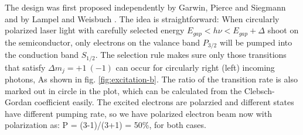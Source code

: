The design was first proposed independently by Garwin, Pierce and Siegmann \cite{GARWIN}
and by Lampel and Weisbuch \cite{LAMPEL1975877}. The idea is straightforward:
When circularly polarized laser light with carefully selected energy $E_{gap} < h\nu < E_{gap} + \Delta$
shoot on the semiconductor, only electrons on the valance band $P_{3/2}$ will be
pumped into the conduction band $S_{1/2}$. The selection rule makes sure only
those transitions that satisfy $\Delta m_j = +1 \ (-1)$ can occur for circularly
right (left) incoming photons, As shown in fig. \ref{fig:excitation-b}.
The ratio of the transition rate is also marked out in circle in the plot, 
which can be calculated from the Clebsch-Gordan coefficient easily. The excited
electrons are polarzied and different states have different pumping rate, so
we have polarized electron beam now with polarization as: P = (3-1)/(3+1) = 50\%,
for both cases.
